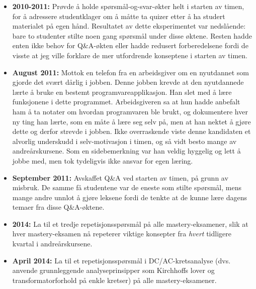 \begin{itemize}
\vskip 10pt
\item{} {\bf 2010-2011:} Prøvde å holde spørsmål-og-svar-økter helt i starten av timen, for å adressere studentklager om å måtte ta quizer etter å ha studert materialet på egen hånd.  Resultatet av dette eksperimentet var nedslående: bare to studenter stilte noen gang spørsmål under disse øktene.  Resten hadde enten ikke behov for Q\&A-økten eller hadde redusert forberedelsene fordi de visste at jeg ville forklare de mer utfordrende konseptene i starten av timen.
\vskip 10pt
\item{} {\bf August 2011:} Mottok en telefon fra en arbeidsgiver om en nyutdannet som gjorde det svært dårlig i jobben.  Denne jobben krevde at den nyutdannede lærte å bruke en bestemt programvareapplikasjon.  Han slet med å lære funksjonene i dette programmet.  Arbeidsgiveren sa at hun hadde anbefalt ham å ta notater om hvordan programvaren ble brukt, og dokumentere hver ny ting han lærte, som en måte å lære seg selv på, men at han nektet å gjøre dette og derfor strevde i jobben.  Ikke overraskende viste denne kandidaten et alvorlig underskudd i selv-motivasjon i timen, og så vidt besto mange av andreårskursene.  Som en sidebemerkning var han veldig hyggelig og lett å jobbe med, men tok tydeligvis ikke ansvar for egen læring.
\vskip 10pt
\item{} {\bf September 2011:} Avskaffet Q\&A ved starten av timen, på grunn av misbruk.  De samme få studentene var de eneste som stilte spørsmål, mens mange andre unnlot å gjøre leksene fordi de tenkte at de kunne lære dagens temaer fra disse Q\&A-øktene.
\vskip 10pt
\item{} {\bf 2014:} La til et tredje repetisjonsspørsmål på alle mastery-eksamener, slik at hver mastery-eksamen nå repeterer viktige konsepter fra {\it hvert} tidligere kvartal i andreårskursene.
\vskip 10pt
\item{} {\bf April 2014:} La til et repetisjonsspørsmål i DC/AC-kretsanalyse (dvs. anvende grunnleggende analyseprinsipper som Kirchhoffs lover og transformatorforhold på enkle kretser) på alle mastery-eksamener.
\vskip 10pt

\end{itemize}
